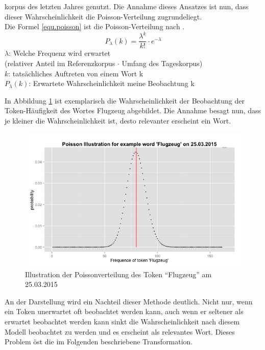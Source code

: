 korpus des letzten Jahres genutzt. Die Annahme dieses Ansatzes ist nun, dass dieser Wahrscheinlichkeit die Poisson-Verteilung zugrundeliegt.\\
Die Formel \ref{equ.poisson} ist die Poisson-Verteilung nach \cite[S. 338 ff]{heyer06}.
	\begin{equation}\label{equ.poisson}
	P_\lambda(k) = \frac{\lambda^{k}}{k!}  \cdot e^{-\lambda}
	\end{equation}
	$\lambda$: Welche Frequenz wird erwartet \\
	(relativer Anteil im Referenzkorpus $\cdot$ Umfang des Tageskorpus)\\
	$k$: tatsächliches Auftreten von einem Wort k\\
	$P_\lambda(k)$: Erwartete Wahrscheinlichkeit meine Beobachtung k


In Abbildung \ref{pic.poisson_algemein} ist exemplarisch die Wahrscheinlichkeit der Beobachtung der Token-Häufigkeit des Wortes Flugzeug abgebildet. Die Annahme besagt nun, dass je kleiner die Wahrscheinlichkeit
ist, desto relevanter erscheint ein Wort. \\

\begin{figure}[h!]
    \centering
    \includegraphics[width=1\textwidth]{pictures/poissonVerteilungFlugzeug.png}
    \caption{Illustration der Poissonverteilung des Token \enquote{Flugzeug} am 25.03.2015}\label{pic.poisson_algemein}
\end{figure}

An der Darstellung wird ein Nachteil dieser Methode deutlich. Nicht nur, wenn ein Token unerwartet oft beobachtet werden kann, auch wenn er seltener als erwartet beobachtet werden kann sinkt die Wahrscheinlichkeit nach diesem Modell beobachtet zu werden und es erscheint als relevantes Wort. Dieses Problem öst die im Folgenden beschriebene Transformation.\\

